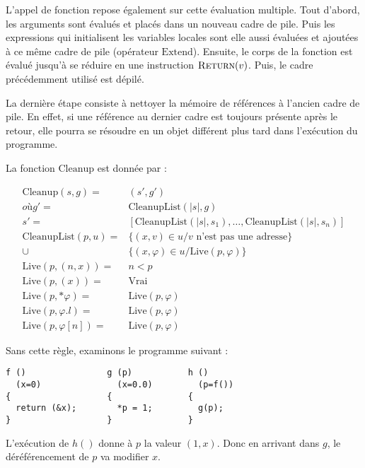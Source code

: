 L'appel de fonction repose également sur cette évaluation multiple. Tout
d'abord, les arguments sont évalués et placés dans un nouveau cadre de pile.
Puis les expressions qui initialisent les variables locales sont elle aussi
évaluées et ajoutées à ce même cadre de pile (opérateur $\mathrm{Extend}$).
Ensuite, le corps de la fonction est évalué jusqu'à se réduire en une
instruction $\textsc{Return}(v)$. Puis, le cadre précédemment utilisé est dépilé.

La dernière étape consiste à nettoyer la mémoire de références à l'ancien cadre
de pile. En effet, si une référence au dernier cadre est toujours présente après
le retour, elle pourra se résoudre en un objet différent plus tard dans
l'exécution du programme.

La fonction $\mathrm{Cleanup}$ est donnée par :

\def\cleanuplist#1#2{\mathrm{CleanupList}(#1, #2)}
\def\cllive#1#2{\mathrm{Live}(#1, #2)}

\begin{align*}
  \mathrm{Cleanup}(s, g)  = & (s', g') \\
                    où g' = & \cleanuplist{|s|}{g} \\
                       s' = & [\cleanuplist{|s|}{s_1},
                            …, \cleanuplist{|s|}{s_n}] \\
       \cleanuplist{p}{u} = & \{(x, v) ∈ u / v\mbox{ n'est pas une adresse} \} \\
                       \cup & \{(x, φ) ∈ u / \cllive{p}{φ} \} \\
    \cllive{p}{(n, x)} = & n < p \\
    \cllive{p}{(x)}    = & \mathrm{Vrai} \\
    \cllive{p}{*φ}     = & \cllive{p}{φ} \\
    \cllive{p}{φ.l}    = & \cllive{p}{φ} \\
    \cllive{p}{φ[n]}   = & \cllive{p}{φ}
\end{align*}

Sans cette règle, examinons le programme suivant :

\begin{Verbatim}
f ()                g (p)           h ()
  (x=0)               (x=0.0)         (p=f())
{                   {               {
  return (&x);        *p = 1;         g(p);
}                   }               }
\end{Verbatim}

L'exécution de $h()$ donne à $p$ la valeur $(1, x)$. Donc en arrivant dans $g$, le
déréférencement de $p$ va modifier $x$.

